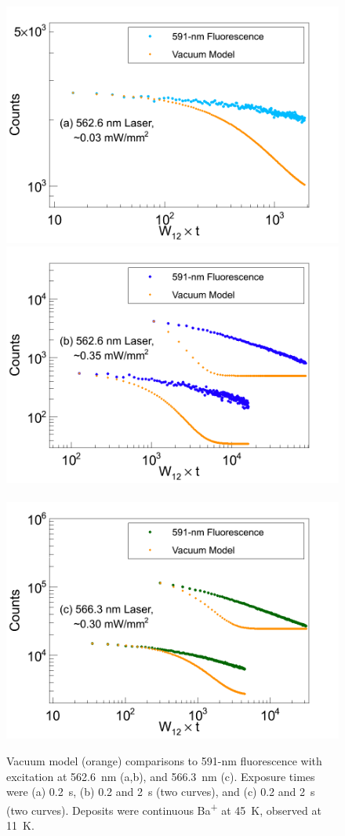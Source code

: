 \begin{figure} %
        \centering
                \includegraphics[width=.5\textwidth]{figures/bleach_model_vacuum_w12t_a.png}
                \includegraphics[width=.5\textwidth]{figures/bleach_model_vacuum_w12t_b.png}
                ~
                \includegraphics[width=.5\textwidth]{figures/bleach_model_vacuum_w12t_c.png}
                \caption{Vacuum model (orange) comparisons to 591-nm fluorescence with excitation at 562.6~nm (a,b), and 566.3~nm (c).  Exposure times were (a) 0.2~s, (b) 0.2 and 2~s (two curves), and (c) 0.2 and 2~s (two curves).  Deposits were continuous Ba\textsuperscript{+} at 45~K, observed at 11~K.}
\label{fig:bleach_model_vac}
\end{figure}


